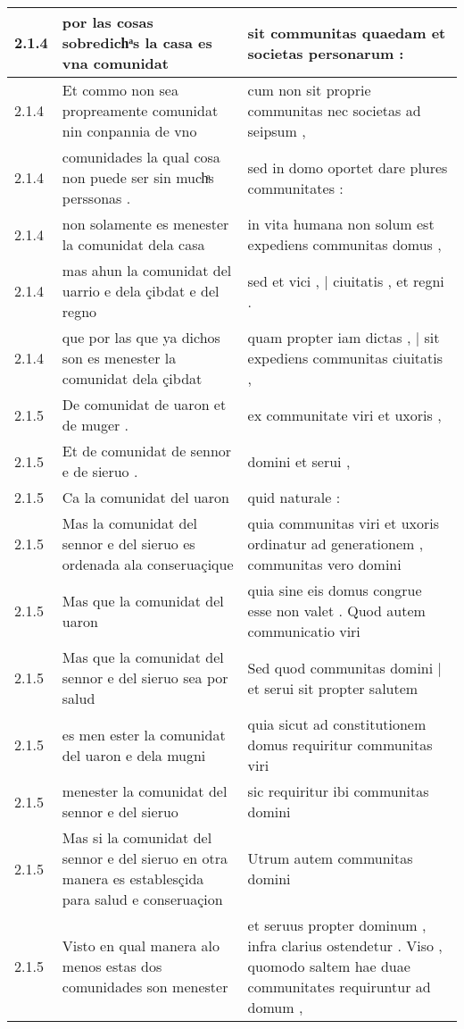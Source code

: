 \begin{tabular}{|p{1cm}|p{6.5cm}|p{6.5cm}|}
2.1.4 & por las cosas sobredichͣs la casa es vna comunidat & sit communitas quaedam et societas personarum : \\\hline
2.1.4 & Et commo non sea propreamente comunidat nin conpannia de vno & cum non sit proprie communitas nec societas ad seipsum , \\\hline
2.1.4 & comunidades la qual cosa non puede ser sin muchͣs perssonas . & sed in domo oportet dare plures communitates : \\\hline
2.1.4 & non solamente es menester la comunidat dela casa & in vita humana non solum est expediens communitas domus , \\\hline
2.1.4 & mas ahun la comunidat del uarrio e dela çibdat e del regno & sed et vici , | ciuitatis , et regni . \\\hline
2.1.4 & que por las que ya dichos son es menester la comunidat dela çibdat & quam propter iam dictas , | sit expediens communitas ciuitatis , \\\hline
2.1.5 & De comunidat de uaron et de muger . & ex communitate viri et uxoris , \\\hline
2.1.5 & Et de comunidat de sennor e de sieruo . & domini et serui , \\\hline
2.1.5 & Ca la comunidat del uaron & quid naturale : \\\hline
2.1.5 & Mas la comunidat del sennor e del sieruo es ordenada ala conseruaçique & quia communitas viri et uxoris ordinatur ad generationem , communitas vero domini \\\hline
2.1.5 & Mas que la comunidat del uaron & quia sine eis domus congrue esse non valet . Quod autem communicatio viri \\\hline
2.1.5 & Mas que la comunidat del sennor e del sieruo sea por salud & Sed quod communitas domini | et serui sit propter salutem \\\hline
2.1.5 & es men ester la comunidat del uaron e dela mugni & quia sicut ad constitutionem domus requiritur communitas viri \\\hline
2.1.5 & menester la comunidat del sennor e del sieruo & sic requiritur ibi communitas domini \\\hline
2.1.5 & Mas si la comunidat del sennor e del sieruo en otra manera es establesçida para salud e conseruaçion & Utrum autem communitas domini \\\hline
2.1.5 & Visto en qual manera alo menos estas dos comunidades son menester & et seruus propter dominum , infra clarius ostendetur . Viso , quomodo saltem hae duae communitates requiruntur ad domum , \\\hline

\end{tabular}
